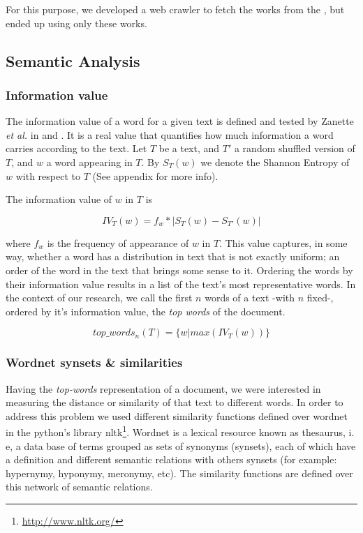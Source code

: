 \documentclass{pnastwo}
\begin{document}
\begin{article}
For this purpose, we developed a web crawler to fetch the works from the \cite{LENIN}, but ended up using only these works.

\subsection{Semantic Analysis}
\medskip
\subsubsection{Information value}

The information value of a word for a given text is defined and tested by Zanette \textit{et al.} in \cite{DARWIN} and \cite{ENTROPIC}.
It is a real value that quantifies how much information a word carries according to the text. Let $T$ be a 
text, and $T'$ a random shuffled version of $T$, and $w$ a word appearing in $T$. 
By $S_T(w)$ we denote the Shannon Entropy of $w$ with respect to $T$ (See appendix for more info). 

The information value of $w$ in $T$ is 

\begin{equation}
  IV_T(w) = f_w* | S_T(w) - S_{T'}(w) | 
\end{equation}

where $f_w$ is the frequency of appearance of $w$ in $T$. This value captures, in some way, whether a word
has a distribution in text that is not exactly uniform; an order of the word in the text that brings some sense to it. 
Ordering the words by their information value results in a list of the text's most representative words. In the context of our research, we call the first $n$ words of a text -with $n$ fixed-, ordered by it's information value, the \textit{top words} of the document.

\begin{equation}
  top\_words_{n}(T) = \{w | max(IV_T(w))\}
\end{equation}


\subsubsection{Wordnet synsets \& similarities}

Having the \textit{top-words} representation of a document, we were interested in measuring the distance or similarity of that text to different words. In order to address this problem we used different similarity functions defined over wordnet in the python's library nltk\footnote{\url{http://www.nltk.org/}}. Wordnet is a lexical resource known as thesaurus, i. e, a data base of terms grouped as sets of synonyms (synsets), each of which have a definition and different semantic relations with others synsets (for example: hypernymy, hyponymy, meronymy, etc). The similarity functions are defined over this network of semantic relations.


\end{article}
\end{document}
